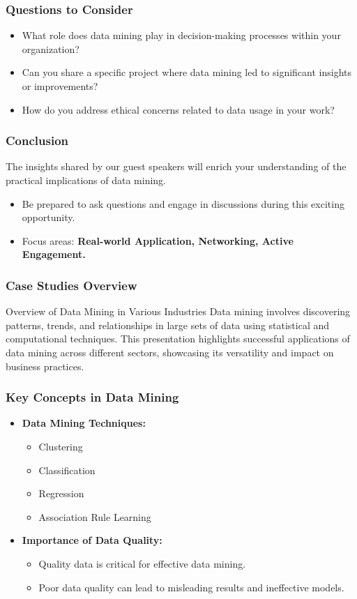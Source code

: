 \documentclass{beamer}
\begin{document}
\begin{frame}[fragile]
    \frametitle{Questions to Consider}
    \begin{itemize}
        \item What role does data mining play in decision-making processes within your organization?
        \item Can you share a specific project where data mining led to significant insights or improvements?
        \item How do you address ethical concerns related to data usage in your work?
    \end{itemize}
\end{frame}

\begin{frame}[fragile]
    \frametitle{Conclusion}
    The insights shared by our guest speakers will enrich your understanding of the practical implications of data mining. 
    \begin{itemize}
        \item Be prepared to ask questions and engage in discussions during this exciting opportunity.
        \item Focus areas: \textbf{Real-world Application, Networking, Active Engagement.}
    \end{itemize}
\end{frame}

\begin{frame}[fragile]
    \frametitle{Case Studies Overview}
    \begin{block}{Overview of Data Mining in Various Industries}
        Data mining involves discovering patterns, trends, and relationships in large sets of data using statistical and computational techniques. This presentation highlights successful applications of data mining across different sectors, showcasing its versatility and impact on business practices.
    \end{block}
\end{frame}

\begin{frame}[fragile]
    \frametitle{Key Concepts in Data Mining}
    \begin{itemize}
        \item \textbf{Data Mining Techniques:} 
        \begin{itemize}
            \item Clustering
            \item Classification
            \item Regression
            \item Association Rule Learning
        \end{itemize}
        \item \textbf{Importance of Data Quality:} 
        \begin{itemize}
            \item Quality data is critical for effective data mining.
            \item Poor data quality can lead to misleading results and ineffective models.
        \end{itemize}
    \end{itemize}
\end{frame}
\end{document}

